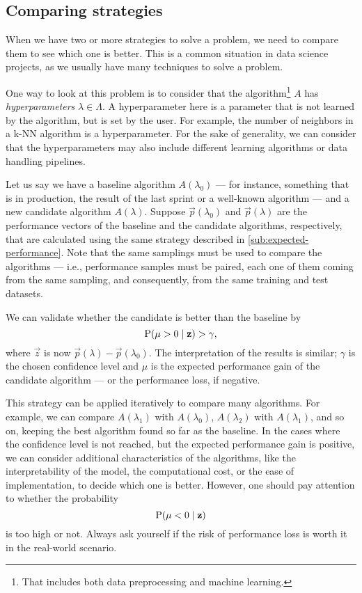 \subsection{Comparing strategies}
\label{sub:comparison}

When we have two or more strategies to solve a problem, we need to compare them to see
which one is better.  This is a common situation in data science projects, as we usually
have many techniques to solve a problem.

One way to look at this problem is to consider that the algorithm\footnote{That includes
both data preprocessing and machine learning.} $A$ has \emph{hyperparameters} $\lambda \in
\Lambda$.  A hyperparameter here is a parameter that is not learned by the algorithm, but
is set by the user.  For example, the number of neighbors in a k-NN algorithm is a
hyperparameter.  For the sake of generality, we can consider that the hyperparameters may
also include different learning algorithms or data handling pipelines.

Let us say we have a baseline algorithm $A(\lambda_0)$ --- for instance, something that is
in production, the result of the last sprint or a well-known algorithm --- and a new candidate algorithm $A(\lambda)$.
Suppose $\vec{p}(\lambda_0)$ and $\vec{p}(\lambda)$ are the performance vectors of the
baseline and the candidate algorithms, respectively, that are calculated using the same
strategy described in \cref{sub:expected-performance}.  Note that the
same samplings must be used to compare the algorithms --- i.e., performance samples must be
paired, each one of them coming from the same sampling, and consequently, from the same
training and test datasets.

We can validate whether the
candidate is better than the baseline by
\begin{equation*}
  \operatorname{P}(\mu > 0 \mid \mathbf{z}) > \gamma\text{,}
\end{equation*}
where $\vec{z}$ is now $\vec{p}(\lambda) - \vec{p}(\lambda_0)$.  The interpretation of the
results is similar; $\gamma$ is the chosen confidence level and $\mu$ is the expected
performance gain of the candidate algorithm --- or the performance loss, if negative.

This strategy can be applied iteratively to compare many algorithms.  For example, we can
compare $A(\lambda_1)$ with $A(\lambda_0)$, $A(\lambda_2)$ with $A(\lambda_1)$, and so on,
keeping the best algorithm found so far as the baseline. In the cases where the confidence
level is not reached, but the expected performance gain is positive, we can consider
additional characteristics of the algorithms, like the interpretability of the model, the
computational cost, or the ease of implementation, to decide which one is better. However,
one should pay attention to whether the probability
\begin{equation*}
  \operatorname{P}(\mu < 0 \mid \mathbf{z})
\end{equation*}
is too high or not.  Always ask yourself if the risk of performance loss is worth it in
the real-world scenario.


